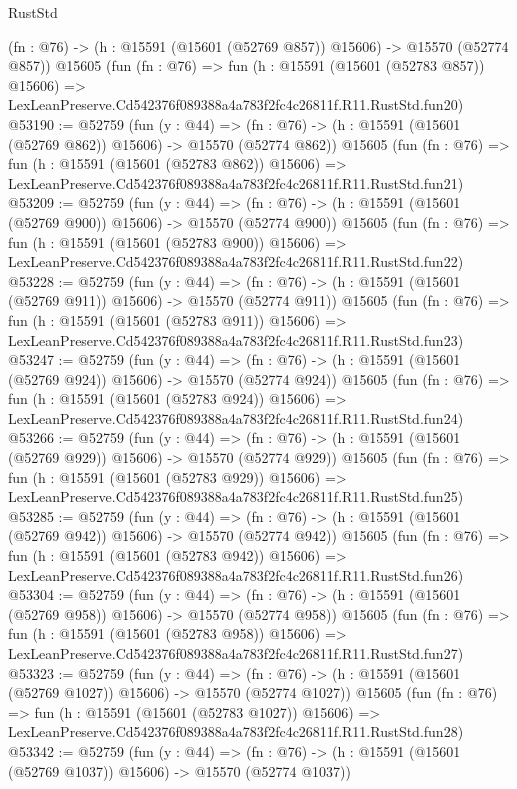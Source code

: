 \begin{lexlean}{RustStd}
\begin{coremodule}
    (fn : @76) -> (h : @15591 (@15601 (@52769 @857)) @15606) -> @15570 (@52774 @857))
    @15605
    (fun (fn : @76) =>
    fun (h : @15591 (@15601 (@52783 @857)) @15606) =>
    LexLeanPreserve.Cd542376f089388a4a783f2fc4c26811f.R11.RustStd.fun20)
@53190 := @52759
    (fun (y : @44) =>
    (fn : @76) -> (h : @15591 (@15601 (@52769 @862)) @15606) -> @15570 (@52774 @862))
    @15605
    (fun (fn : @76) =>
    fun (h : @15591 (@15601 (@52783 @862)) @15606) =>
    LexLeanPreserve.Cd542376f089388a4a783f2fc4c26811f.R11.RustStd.fun21)
@53209 := @52759
    (fun (y : @44) =>
    (fn : @76) -> (h : @15591 (@15601 (@52769 @900)) @15606) -> @15570 (@52774 @900))
    @15605
    (fun (fn : @76) =>
    fun (h : @15591 (@15601 (@52783 @900)) @15606) =>
    LexLeanPreserve.Cd542376f089388a4a783f2fc4c26811f.R11.RustStd.fun22)
@53228 := @52759
    (fun (y : @44) =>
    (fn : @76) -> (h : @15591 (@15601 (@52769 @911)) @15606) -> @15570 (@52774 @911))
    @15605
    (fun (fn : @76) =>
    fun (h : @15591 (@15601 (@52783 @911)) @15606) =>
    LexLeanPreserve.Cd542376f089388a4a783f2fc4c26811f.R11.RustStd.fun23)
@53247 := @52759
    (fun (y : @44) =>
    (fn : @76) -> (h : @15591 (@15601 (@52769 @924)) @15606) -> @15570 (@52774 @924))
    @15605
    (fun (fn : @76) =>
    fun (h : @15591 (@15601 (@52783 @924)) @15606) =>
    LexLeanPreserve.Cd542376f089388a4a783f2fc4c26811f.R11.RustStd.fun24)
@53266 := @52759
    (fun (y : @44) =>
    (fn : @76) -> (h : @15591 (@15601 (@52769 @929)) @15606) -> @15570 (@52774 @929))
    @15605
    (fun (fn : @76) =>
    fun (h : @15591 (@15601 (@52783 @929)) @15606) =>
    LexLeanPreserve.Cd542376f089388a4a783f2fc4c26811f.R11.RustStd.fun25)
@53285 := @52759
    (fun (y : @44) =>
    (fn : @76) -> (h : @15591 (@15601 (@52769 @942)) @15606) -> @15570 (@52774 @942))
    @15605
    (fun (fn : @76) =>
    fun (h : @15591 (@15601 (@52783 @942)) @15606) =>
    LexLeanPreserve.Cd542376f089388a4a783f2fc4c26811f.R11.RustStd.fun26)
@53304 := @52759
    (fun (y : @44) =>
    (fn : @76) -> (h : @15591 (@15601 (@52769 @958)) @15606) -> @15570 (@52774 @958))
    @15605
    (fun (fn : @76) =>
    fun (h : @15591 (@15601 (@52783 @958)) @15606) =>
    LexLeanPreserve.Cd542376f089388a4a783f2fc4c26811f.R11.RustStd.fun27)
@53323 := @52759
    (fun (y : @44) =>
    (fn : @76) -> (h : @15591 (@15601 (@52769 @1027)) @15606) -> @15570 (@52774 @1027))
    @15605
    (fun (fn : @76) =>
    fun (h : @15591 (@15601 (@52783 @1027)) @15606) =>
    LexLeanPreserve.Cd542376f089388a4a783f2fc4c26811f.R11.RustStd.fun28)
@53342 := @52759
    (fun (y : @44) =>
    (fn : @76) -> (h : @15591 (@15601 (@52769 @1037)) @15606) -> @15570 (@52774 @1037))

\end{coremodule}
\end{lexlean}
